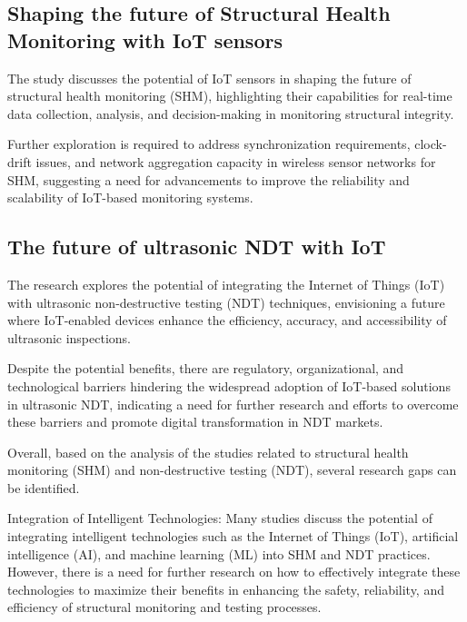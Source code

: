 \documentclass[journal, a4paper]{IEEEtran}
\begin{document}
\subsection{Shaping the future of Structural Health Monitoring with IoT sensors}
The study discusses the potential of IoT sensors in shaping the future of structural health monitoring (SHM), highlighting their capabilities for real-time data collection, analysis, and decision-making in monitoring structural integrity. 

\begin{description}[style=standard, font=\normalfont]
  \item[Research gap:] Further exploration is required to address synchronization requirements, clock-drift issues, and network aggregation capacity in wireless sensor networks for SHM, suggesting a need for advancements to improve the reliability and scalability of IoT-based monitoring systems.
\end{description}
 

\subsection{The future of ultrasonic NDT with IoT}
The research explores the potential of integrating the Internet of Things (IoT) with ultrasonic non-destructive testing (NDT) techniques, envisioning a future where IoT-enabled devices enhance the efficiency, accuracy, and accessibility of ultrasonic inspections. 

\begin{description}[style=standard, font=\normalfont]
  \item[Research gap:] Despite the potential benefits, there are regulatory, organizational, and technological barriers hindering the widespread adoption of IoT-based solutions in ultrasonic NDT, indicating a need for further research and efforts to overcome these barriers and promote digital transformation in NDT markets.  
\end{description}


Overall, based on the analysis of the studies related to structural health monitoring (SHM) and non-destructive testing (NDT), several research gaps can be identified. 

Integration of Intelligent Technologies: Many studies discuss the potential of integrating intelligent technologies such as the Internet of Things (IoT), artificial intelligence (AI), and machine learning (ML) into SHM and NDT practices. However, there is a need for further research on how to effectively integrate these technologies to maximize their benefits in enhancing the safety, reliability, and efficiency of structural monitoring and testing processes. 
\end{document}
